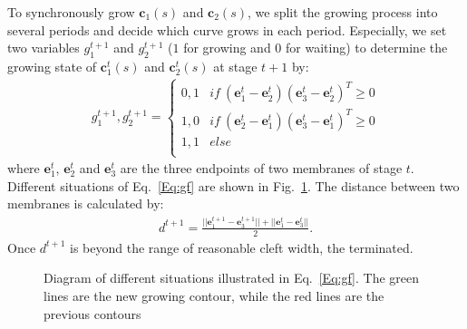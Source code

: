 To synchronously grow $\mathbf{c}_1(s)$ and $\mathbf{c}_2(s)$, we split the growing process into several periods and decide which curve grows in each period.
%
Especially, we set two variables $g_1^{t+1}$ and $g_2^{t+1}$  ($1$ for growing and $0$ for waiting) to determine the growing state of $\mathbf{c}_1^{t}(s)$ and $\mathbf{c}_2^{t}(s)$ at stage $t+1$ by:
\begin{eqnarray}\label{Eq:gf}
g_1^{t+1},g_2^{t+1} = \left\{\begin{array}{cc}
0,1&if~(\mathbf{e}_1^t-\mathbf{e}_2^t)(\mathbf{e}_3^t-\mathbf{e}_2^t)^{T}\geq 0 \\
1,0&if~(\mathbf{e}_2^t-\mathbf{e}_1^t)(\mathbf{e}_3^t-\mathbf{e}_1^t)^{T}\geq 0\\
1,1& else\\
\end{array}\right.
\end{eqnarray}
where $\mathbf{e}_1^t$, $\mathbf{e}_2^t$ and $\mathbf{e}_3^t$ are the three endpoints of two membranes of stage $t$.
Different situations of Eq.~\ref{Eq:gf} are shown in Fig.~\ref{fig:sg}.
The distance between two membranes is calculated by:
\begin{eqnarray}\label{Eq:d}
d^{t+1} = \frac{||\mathbf{e}_1^{t+1}-\mathbf{e}_3^{t+1}||+ ||\mathbf{e}_1^{t}-\mathbf{e}_3^{t}||}{2}.
\end{eqnarray}
Once $d^{t+1}$ is beyond the range of  reasonable cleft width, the  terminated.
\begin{figure}[t]
\begin{minipage}[b]{1.0\linewidth}
  \centering
 \centerline{}
\end{minipage}
\caption{Diagram of different situations illustrated in Eq.~\ref{Eq:gf}.
        The green lines are the new growing contour, while the red lines are the previous contours}
\label{fig:sg}
\end{figure}
